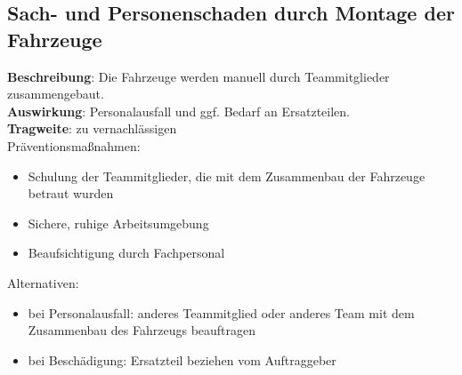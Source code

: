 \documentclass[a4paper, 12pt, titlepage]{scrartcl}
\begin{document}
	\subsection{Sach- und Personenschaden durch Montage der Fahrzeuge}
		\textbf{Beschreibung}: Die Fahrzeuge werden manuell durch Teammitglieder zusammengebaut.\\
		\textbf{Auswirkung}: Personalausfall und ggf. Bedarf an Ersatzteilen.\\
		\textbf{Tragweite}: zu vernachl\"assigen\\
		Pr\"aventionsma\ss nahmen:
			\begin{itemize}
				\item Schulung der Teammitglieder, die mit dem Zusammenbau der Fahrzeuge betraut wurden
				\item Sichere, ruhige Arbeitsumgebung
				\item Beaufsichtigung durch Fachpersonal
			\end{itemize}
		Alternativen: 
			\begin{itemize}
				\item bei Personalausfall: anderes Teammitglied oder anderes Team mit dem Zusammenbau des Fahrzeugs beauftragen
				\item bei Besch\"adigung: Ersatzteil beziehen vom Auftraggeber
			\end{itemize}
		
\end{document}
